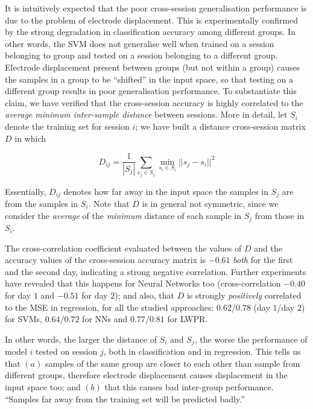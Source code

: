 It is intuitively expected that the poor cross-session generalisation
performance is due to the problem of electrode displacement. This is
experimentally confirmed by the strong degradation in classification
accuracy among different groups. In other words, the SVM does not
generalise well when trained on a session belonging to group and
tested on a session belonging to a different group. Electrode
displacement present between groups (but not within a group) causes
the samples in a group to be ``shifted'' in the input space, so that
testing on a different group results in poor generalisation
performance. To substantiate this claim, we have verified that the
cross-session accuracy is highly correlated to the
\emph{average minimum inter-sample distance} between sessions. More in
detail, let $S_i$ denote the training set for session $i$; we have
built a distance cross-session matrix $D$ in which

$$ D_{ij} = \frac{1}{|S_j|} \sum_{s_j \in S_j}{\min_{s_i \in S_i}{ ||s_j-s_i||^2 } } $$

Essentially, $D_{ij}$ denotes how far away in the input space the
samples in $S_j$ are from the samples in $S_i$. Note that $D$ is in
general not symmetric, since we consider the \emph{average} of the
\emph{minimum} distance of each sample in $S_j$ from those in $S_i$.

The cross-correlation coefficient evaluated between the values of $D$
and the accuracy values of the cross-session accuracy matrix is
$-0.61$ \emph{both} for the first and the second day, indicating a
strong negative correlation. Further experiments have revealed that
this happens for Neural Networks too (cross-correlation $-0.40$ for
day $1$ and $-0.51$ for day $2$); and also, that $D$ is strongly
\emph{positively} correlated to the MSE in regression, for all the
studied approaches: $0.62/0.78$ (day $1$/day $2$) for SVMs,
$0.64/0.72$ for NNs and $0.77/0.81$ for LWPR.

In other words, the larger the distance of $S_i$ and $S_j$, the worse
the performance of model $i$ tested on session $j$, both in
classification and in regression. This tells us that $(a)$ samples of
the same group are closer to each other than sample from different
groups, therefore electrode displacement causes displacement in the
input space too; and $(b)$ that this causes bad inter-group
performance. ``Samples far away from the training set will be
predicted badly.''


